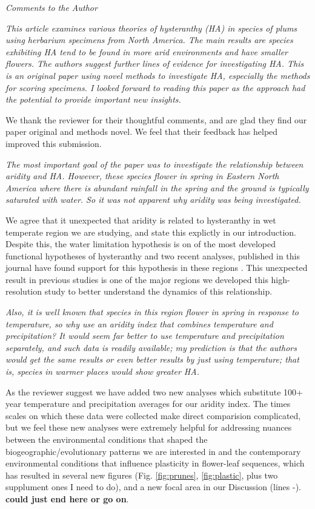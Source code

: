 \documentclass{article}[12pt]
\begin{document}


\emph{Comments to the Author}

\emph{This article examines various theories of hysteranthy (HA) in species of plums using herbarium specimens from North America. The main results are species exhibiting HA tend to be found in more arid environments and have smaller flowers.  The authors suggest further lines of evidence for investigating HA. This is an original paper using novel methods to investigate HA, especially the methods for scoring specimens.  I looked forward to reading this paper as the approach had the potential to provide important new insights.}

We thank the reviewer for their thoughtful comments, and are glad they find our paper original and methods novel. We feel that their feedback has helped improved this submission.

\emph{The most important goal of the paper was to investigate the relationship between aridity and HA. However, these species flower in spring in Eastern North America where there is abundant rainfall in the spring and the ground is typically saturated with water. So it was not apparent why aridity was being investigated.}

We agree that it unexpected that aridity is related to hysteranthy in wet temperate region we are studying, and state this explictly in our introduction. Despite this, the water limitation hypothesis is on of the most developed functional hypotheses of hysteranthy and two recent analyses, published in this journal have found support for this hypothesis in these regions \citep{}. This unexpected result in previous studies is one of the major regions we developed this high-resolution study to better understand the dynamics of this relationship.

\emph{Also, it is well known that species in this region flower in spring in response to temperature, so why use an aridity index that combines temperature and precipitation?  It would seem far better to use temperature and precipitation separately, and such data is readily available; my prediction is that the authors would get the same results or even better results by just using temperature; that is, species in warmer places would show greater HA.}

As the reviewer suggest we have added two new analyses which substitute 100+ year temperature and precipitation averages for our aridity index. The times scales on which these data were collected make direct comparision complicated, but we feel these new analyses were extremely helpful for addressing nuances between the environmental conditions that shaped the biogeographic/evolutionary patterns we are interested in and the contemporary environmental conditions that influence plasticity in flower-leaf sequences, which has resulted in several new figures (Fig. \ref{fig:prunes}, \ref{fig:plastic}, plus two supplument ones I need to do), and a new focal area in our Discussion (lines -). \textbf{could just end here or go on}.
\end{document}
